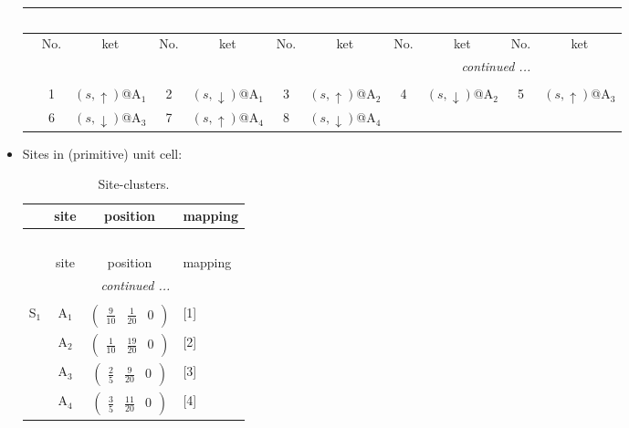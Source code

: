 \documentclass[fleqn,10pt,landscape]{article}
\begin{document}
\begin{itemize}
\begin{center}
\begin{longtable}{c|cc|cc|cc|cc|cc}
\multicolumn{10}{l}{\tablename\ \thetable{}} \\
 \hline \hline
 & No. & ket & No. & ket & No. & ket & No. & ket & No. & ket \\ \hline \endhead

 \hline \hline
\multicolumn{10}{r}{\footnotesize\it continued ...} \\ \endfoot

 \hline \hline
\multicolumn{10}{r}{} \\ \endlastfoot

 & 1 & $(s,\uparrow)$@A$_{1}$ & 2 & $(s,\downarrow)$@A$_{1}$ & 3 & $(s,\uparrow)$@A$_{2}$ & 4 & $(s,\downarrow)$@A$_{2}$ & 5 & $(s,\uparrow)$@A$_{3}$ \\
& 6 & $(s,\downarrow)$@A$_{3}$ & 7 & $(s,\uparrow)$@A$_{4}$ & 8 & $(s,\downarrow)$@A$_{4}$ &  &  &  &  \\
\end{longtable}
\end{center}

\item Sites in (primitive) unit cell:
\begin{center}
\renewcommand{\arraystretch}{1.3}
\begin{longtable}{cc|c|l}
\caption{Site-clusters.}
 \\
 \hline \hline
 & site & position & mapping \\ \hline \endfirsthead

\multicolumn{3}{l}{\tablename\ \thetable{}} \\
 \hline \hline
 & site & position & mapping \\ \hline \endhead

 \hline \hline
\multicolumn{3}{r}{\footnotesize\it continued ...} \\ \endfoot

 \hline \hline
\multicolumn{3}{r}{} \\ \endlastfoot

S$_{1}$ & A$_1$ & $\begin{pmatrix} \frac{9}{10} & \frac{1}{20} & 0 \end{pmatrix}$ & [1] \\
& A$_2$ & $\begin{pmatrix} \frac{1}{10} & \frac{19}{20} & 0 \end{pmatrix}$ & [2] \\
& A$_3$ & $\begin{pmatrix} \frac{2}{5} & \frac{9}{20} & 0 \end{pmatrix}$ & [3] \\
& A$_4$ & $\begin{pmatrix} \frac{3}{5} & \frac{11}{20} & 0 \end{pmatrix}$ & [4] \\
\end{longtable}
\end{center}


\end{itemize}
\end{document}
